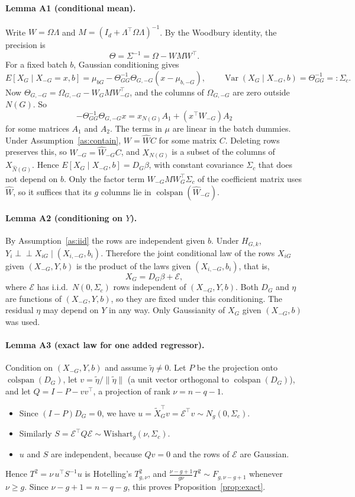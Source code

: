 \documentclass[10pt,twocolumn,letterpaper]{article}
\theoremstyle{remark}
\newcommand{\indep}{\perp\!\!\!\perp}
\begin{document}
\paragraph{Lemma A1 (conditional mean).} Write $W=\Omega\Lambda$ and $M=(I_d+\Lambda^\top\Omega\Lambda)^{-1}$. By the Woodbury identity, the precision is
\[
\Theta=\Sigma^{-1}=\Omega-WMW^\top .
\]
For a fixed batch $b$, Gaussian conditioning gives
\[
E[X_G\mid X_{-G}=x,b]=\mu_{bG}-\Theta_{GG}^{-1}\Theta_{G,-G}(x-\mu_{b,-G}),\qquad \operatorname{Var}(X_G\mid X_{-G},b)=\Theta_{GG}^{-1}=:\Sigma_c .
\]
Now $\Theta_{G,-G}=\Omega_{G,-G}-W_GMW_{-G}^\top$, and the columns of $\Omega_{G,-G}$ are zero outside $N(G)$. So
\[
-\Theta_{GG}^{-1}\Theta_{G,-G}x=x_{N(G)}A_1+(x^\top W_{-G})A_2
\]
for some matrices $A_1$ and $A_2$. The terms in $\mu$ are linear in the batch dummies. Under Assumption~\ref{as:contain}, $W=\hat WC$ for some matrix $C$. Deleting rows preserves this, so $W_{-G}=\hat W_{-G}C$, and $X_{N(G)}$ is a subset of the columns of $X_{\hat N(G)}$. Hence $E[X_G\mid X_{-G},b]=D_G\beta$, with constant covariance $\Sigma_c$ that does not depend on $b$. Only the factor term $W_{-G}MW_G^\top\Sigma_c$ of the coefficient matrix uses $\hat W$, so it suffices that its $g$ columns lie in $\operatorname{colspan}(\hat W_{-G})$.

\paragraph{Lemma A2 (conditioning on $Y$).} By Assumption~\ref{as:iid} the rows are independent given $b$. Under $H_{G,k}$, $Y_i\indep X_{iG}\mid(X_{i,-G},b_i)$. Therefore the joint conditional law of the rows $X_{iG}$ given $(X_{-G},Y,b)$ is the product of the laws given $(X_{i,-G},b_i)$, that is,
\[
X_G=D_G\beta+\mathcal E,
\]
where $\mathcal E$ has i.i.d.\ $N(0,\Sigma_c)$ rows independent of $(X_{-G},Y,b)$. Both $D_G$ and $\eta$ are functions of $(X_{-G},Y,b)$, so they are fixed under this conditioning. The residual $\eta$ may depend on $Y$ in any way. Only Gaussianity of $X_G$ given $(X_{-G},b)$ was used.

\paragraph{Lemma A3 (exact law for one added regressor).} Condition on $(X_{-G},Y,b)$ and assume $\tilde\eta\neq0$. Let $P$ be the projection onto $\operatorname{colspan}(D_G)$, let $v=\tilde\eta/\|\tilde\eta\|$ (a unit vector orthogonal to $\operatorname{colspan}(D_G)$), and let $Q=I-P-vv^\top$, a projection of rank $\nu=n-q-1$.
\begin{itemize}
  \item Since $(I-P)D_G=0$, we have $u=\tilde X_G^\top v=\mathcal E^\top v\sim N_g(0,\Sigma_c)$.
  \item Similarly $S=\mathcal E^\top Q\mathcal E\sim \mathrm{Wishart}_g(\nu,\Sigma_c)$.
  \item $u$ and $S$ are independent, because $Qv=0$ and the rows of $\mathcal E$ are Gaussian.
\end{itemize}
Hence $T^2=\nu\,u^\top S^{-1}u$ is Hotelling's $T^2_{g,\nu}$, and $\frac{\nu-g+1}{g\nu}T^2\sim F_{g,\nu-g+1}$ whenever $\nu\ge g$. Since $\nu-g+1=n-q-g$, this proves Proposition~\ref{prop:exact}.
\end{document}
